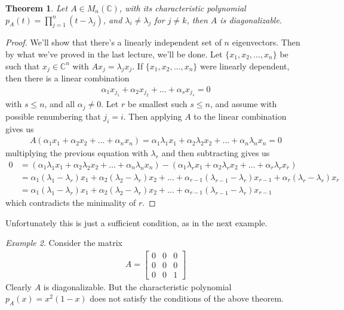 \documentclass[12pt]{article}
\newtheorem{thm}{Theorem}[section]
\theoremstyle{definition}
\theoremstyle{remark}
\newtheorem{ex}[thm]{Example}
\begin{document}
\begin{thm}
  Let $A \in M_n(\mathbb{C})$, with its characteristic polynomial
  $p_A(t) = \prod_{j = 1}^{n} (t - \lambda_j)$, and $\lambda_i \neq
  \lambda_j$ for $j \neq k$, then $A$ is diagonalizable.
\end{thm}
\begin{proof}
  We'll show that there's a linearly independent set of $n$
  eigenvectors. Then by what we've proved in the last lecture, we'll
  be done. Let $\{ x_1 , x_2 , \ldots , x_n \}$ be such that $x_j \in
  \mathbb{C}^n$ with $Ax_j = \lambda_j x_j$. If $\{x_1 , x_2 , \ldots
  , x_n  \}$ were linearly dependent, then there is a linear combination
  \begin{align*}
    \alpha_1x_{j_1} + \alpha_2x_{j_2} + \ldots + \alpha_sx_{j_s} = 0
  \end{align*}
  with $s \le n$, and all $\alpha_j \neq 0$. Let $r$ be smallest such
  $s \le n$, and assume with possible renumbering that $j_i = i$.
  Then applying $ A$ to the linear combination gives us
  \begin{align*}
    A( \alpha_1x_{1} + \alpha_2x_{2} + \ldots + \alpha_nx_{n})
    =\alpha_1 \lambda_1 x_{1} + \alpha_2 \lambda_2 x_{2} + \ldots +
    \alpha_n \lambda_n x_{n}  = 0
  \end{align*}
  multiplying the previous equation with $\lambda_r$ and then
  subtracting gives us
  \begin{align*}
    0 &= (\alpha_1 \lambda_1 x_{1} + \alpha_2 \lambda_2 x_{2} +
    \ldots + \alpha_n \lambda_n x_{n}) - (\alpha_1 \lambda_r x_{1} +
    \alpha_2 \lambda_r x_{2} + \ldots + \alpha_r \lambda_r x_{r}) \\
    &= \alpha_1 (\lambda_1 - \lambda_r) x_{1} + \alpha_2 (\lambda_2 -
    \lambda_r) x_{2} + \ldots + \alpha_{r-1} (\lambda_{r-1} -
    \lambda_r) x_{r-1} + \alpha_r (\lambda_r - \lambda_r) x_{r} \\
    &= \alpha_1 (\lambda_1 - \lambda_r) x_{1} + \alpha_2 (\lambda_2 -
    \lambda_r) x_{2} + \ldots + \alpha_{r-1} (\lambda_{r-1} - \lambda_r) x_{r-1}
  \end{align*}
  which contradicts the minimality of $r$.
\end{proof}

Unfortunately this is just a sufficient condition, as in the next example.
\begin{ex}
  Consider the matrix
  \begin{align*}A =
    \begin{bmatrix}%
      0 & 0 & 0\\
      0 & 0 & 0\\
      0 & 0 & 1
    \end{bmatrix}
  \end{align*}
  Clearly $A$ is diagonalizable. But the characteristic polynomial
  $p_A(x) = x^2(1-x)$ does not satisfy the conditions of the above theorem.
\end{ex}
\end{document}
